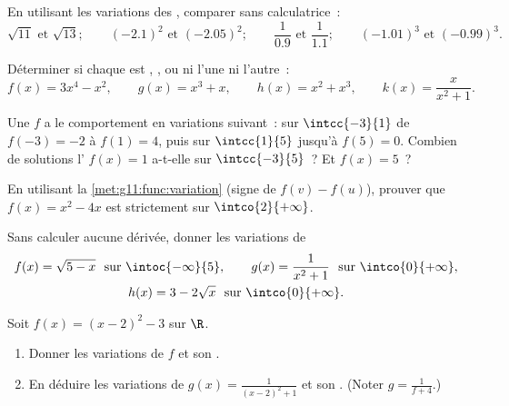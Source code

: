 \begin{exercise}[$\star$]\label{exo:g11:func:2}
En utilisant les variations des , comparer sans
calculatrice~:
\[
\sqrt{11} \text{ et } \sqrt{13}; \qquad
(-2.1)^2 \text{ et } (-2.05)^2; \qquad
\frac{1}{0.9} \text{ et } \frac{1}{1.1}; \qquad
(-1.01)^3 \text{ et } (-0.99)^3 .
\]
\end{exercise}

\begin{exercise}[$\star$]\label{exo:g11:func:3}
Déterminer si chaque  est , , ou ni l'une ni
l'autre~:
\[
f(x) = 3x^4 - x^2, \qquad
g(x) = x^3 + x, \qquad
h(x) = x^2 + x^3, \qquad
k(x) = \frac{x}{x^2+1} .
\]
\end{exercise}

\begin{exercise}[$\star$]\label{exo:g11:func:4}
Une  $f$ a le comportement en variations suivant~:  sur
$\intcc{-3}{1}$ de $f(-3) = -2$ à $f(1) = 4$, puis  sur
$\intcc{1}{5}$ jusqu'à $f(5) = 0$. Combien de solutions l'
$f(x) = 1$ a-t-elle sur $\intcc{-3}{5}$~? Et $f(x) = 5$~?
\end{exercise}

\begin{exercise}[$\star\star$]\label{exo:g11:func:5}
En utilisant la \cref{met:g11:func:variation} (signe de $f(v) - f(u)$),
prouver que $f(x) = x^2 - 4x$ est strictement  sur
$\intco{2}{+\infty}$.
\end{exercise}

\begin{exercise}[$\star\star$]\label{exo:g11:func:6}
Sans calculer aucune dérivée, donner les variations de
\begin{gather*}
f(x) = \sqrt{5 - x} \ \text{ sur } \intoc{-\infty}{5},
\qquad
g(x) = \frac{1}{x^2 + 1} \ \text{ sur } \intco{0}{+\infty},
\\
h(x) = 3 - 2\sqrt{x} \ \text{ sur } \intco{0}{+\infty}.
\end{gather*}
\end{exercise}

\begin{exercise}[$\star\star$]\label{exo:g11:func:7}
Soit $f(x) = (x-2)^2 - 3$ sur $\R$.
\begin{enumerate}
  \item Donner les variations de $f$ et son .
  \item En déduire les variations de $g(x) = \frac{1}{(x-2)^2+1}$ et son
        . (Noter $g = \frac{1}{f + 4}$.)
\end{enumerate}
\end{exercise}

